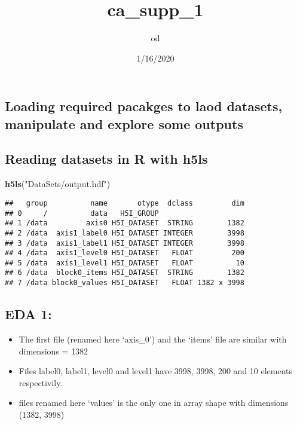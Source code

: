 \documentclass[]{article}
\title{ca\_supp\_1}
\author{od}
\date{1/16/2020}
\newenvironment{Shaded}{\begin{snugshade}}{\end{snugshade}}
\newcommand{\KeywordTok}[1]{\textcolor[rgb]{0.13,0.29,0.53}{\textbf{#1}}}
\newcommand{\NormalTok}[1]{#1}
\newcommand{\StringTok}[1]{\textcolor[rgb]{0.31,0.60,0.02}{#1}}
\providecommand{\tightlist}{%
  \setlength{\itemsep}{0pt}\setlength{\parskip}{0pt}}
\begin{document}
\maketitle

\hypertarget{loading-required-pacakges-to-laod-datasets-manipulate-and-explore-some-outputs}{%
\subsection{Loading required pacakges to laod datasets, manipulate and
explore some
outputs}\label{loading-required-pacakges-to-laod-datasets-manipulate-and-explore-some-outputs}}

\hypertarget{reading-datasets-in-r-with-h5ls}{%
\subsection{Reading datasets in R with
h5ls}\label{reading-datasets-in-r-with-h5ls}}

\begin{Shaded}
\begin{Highlighting}[]
\KeywordTok{h5ls}\NormalTok{(}\StringTok{"DataSets/output.hdf"}\NormalTok{)}
\end{Highlighting}
\end{Shaded}

\begin{verbatim}
##   group          name       otype  dclass         dim
## 0     /          data   H5I_GROUP                    
## 1 /data         axis0 H5I_DATASET  STRING        1382
## 2 /data  axis1_label0 H5I_DATASET INTEGER        3998
## 3 /data  axis1_label1 H5I_DATASET INTEGER        3998
## 4 /data  axis1_level0 H5I_DATASET   FLOAT         200
## 5 /data  axis1_level1 H5I_DATASET   FLOAT          10
## 6 /data  block0_items H5I_DATASET  STRING        1382
## 7 /data block0_values H5I_DATASET   FLOAT 1382 x 3998
\end{verbatim}

\hypertarget{eda-1}{%
\subsection{EDA 1:}\label{eda-1}}

\begin{itemize}
\tightlist
\item
  The first file (renamed here `axis\_0') and the `items' file are
  similar with dimensions = 1382
\item
  Files label0, label1, level0 and level1 have 3998, 3998, 200 and 10
  elements respectivily.
\item
  files renamed here `values' is the only one in array shape with
  dimensions (1382, 3998)
\end{itemize}
\end{document}
